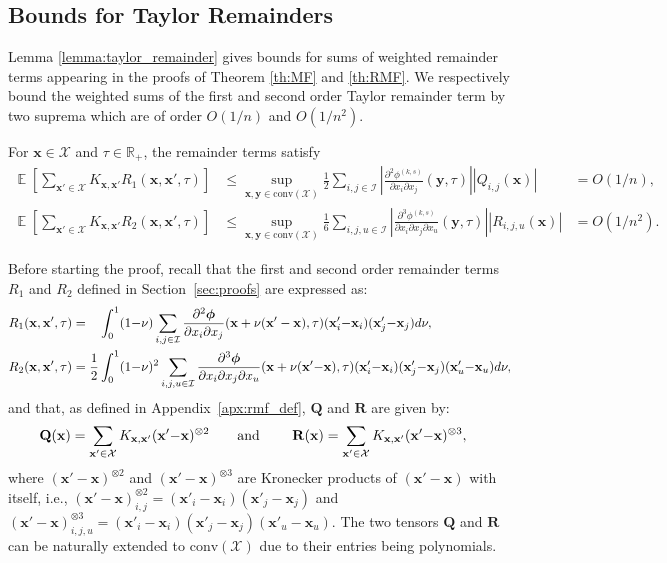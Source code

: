 \documentclass[acmsmall]{acmart}
\newcommand\bx{\mathbf{x}}
\newcommand\by{\mathbf{y}}
\newcommand\bR{\mathbf{R}}
\newcommand\bphi{\text{\boldmath$\phi$}}
\newcommand\bQ{\mathbf{Q}}
\newcommand\calX{\mathcal{X}}
\newcommand\calI{\mathcal{I}}
\newcommand{\R}{\ensuremath{\mathbb{R}}}
\DeclareMathOperator{\E}{\mathbb{E}} %
\newcommand\conv[1]{\mathrm{conv}(#1)}      %
\newcommand\abs[1]{\left|#1\right|}         %
\begin{document}

\subsection{Bounds for Taylor Remainders}

Lemma \ref{lemma:taylor_remainder} gives bounds for sums of weighted remainder terms appearing in the proofs of Theorem \ref{th:MF} and \ref{th:RMF}. We respectively bound the weighted sums of the first and second order Taylor remainder term by two suprema which are of order $O(1/n)$ and $O(1/n^2)$. 

\begin{lemma}
  \label{lemma:taylor_remainder}
  For $\bx \in \calX$ and $\tau \in \R_+$, the remainder terms satisfy
  \begin{align*}
    \E [ \sum_{\bx' \in \calX}K_{\bx,\bx'}R_1(\bx,\bx',\tau) ] &\le \sup_{\bx,\by\in\conv{\calX}} \frac{1}{2}\sum_{i,j\in \calI} \abs{\frac{\partial^2 \phi^{(k,s)}}{\partial x_{i} \partial x_{j} }(\by, \tau)}\abs{Q_{i,j}(\bx)} &= O(1/n),\quad\\
    \E [ \sum_{\bx' \in \calX}K_{\bx,\bx'}R_2(\bx,\bx',\tau) ] &\le \sup_{\bx,\by\in\conv{\calX}} \frac{1}{6} \sum_{i,j,u\in \calI}\abs{\frac{\partial^3 \phi^{(k,s)}}{\partial x_{i} \partial x_{j} \partial x_{u}}(\by, \tau)}\abs{R_{i,j,u}(\bx)} &= O(1/n^2).
  \end{align*}
\end{lemma}

Before starting the proof, recall that the first and second order remainder terms $R_1$ and $R_2$ defined in Section~\ref{sec:proofs} are expressed as:
\begin{align*}
& R_1(\bx,\bx',\tau) = \phantom{\frac{1}{2}} \int_0^1 (1{-}\nu)\sum_{i,j\in\calI} \frac{\partial^2 \bphi}{\partial x_{i} \partial x_{j}}(\bx + \nu(\bx'-\bx) , \tau) (\bx'_i{-}\bx_i)(\bx'_{j}{-}\bx_{j}) d\nu, \\
& R_2(\bx,\bx',\tau)=\frac{1}{2} \int_0^1 (1{-}\nu)^2 \sum_{i,j,u\in\calI} \frac{\partial^3 \bphi}{\partial x_{i} \partial x_{j} \partial x_{u}} (\bx + \nu(\bx'{-}\bx) , \tau) (\bx'_i{-}\bx_i)(\bx'_j{-}\bx_j)(\bx'_u{-}\bx_u)d\nu,
\end{align*}
and that, as defined in Appendix~\ref{apx:rmf_def}, $\bQ$ and $\bR$ are given by:
\begin{align*}
  \bQ(\bx) &= \sum_{\bx' \in \calX} K_{\bx,\bx'}(\bx'{-}\bx)^{\otimes 2} \text{\qquad and \qquad}
  \bR(\bx) = \sum_{\bx' \in \calX} K_{\bx,\bx'}(\bx'{-}\bx)^{\otimes 3},
\end{align*}
where $(\bx'{-}\bx)^{\otimes 2}$ and $(\bx'{-}\bx)^{\otimes 3}$ are Kronecker products of $(\bx'{-}\bx)$ with itself, i.e., $(\bx'{-}\bx)^{\otimes 2}_{i,j} = (\bx'_i{-}\bx_i)(\bx'_j{-}\bx_j)$ and $(\bx'{-}\bx)^{\otimes 3}_{i,j,u} = (\bx'_i{-}\bx_i)(\bx'_j{-}\bx_j)(\bx'_u{-}\bx_u)$. The two tensors $\bQ$ and $\bR$ can be naturally extended to $\conv{\calX}$ due to their entries being polynomials. 
\end{document}
